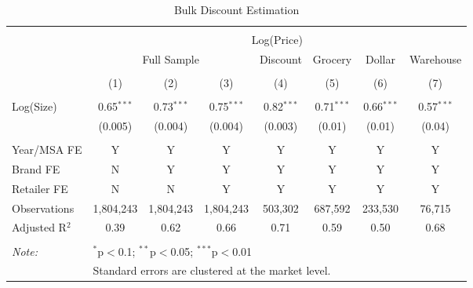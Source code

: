 
\begin{table}[!htbp] \centering 
  \caption{Bulk Discount Estimation} 
  \label{tab:bulkDiscount} 
\begin{tabular}{@{\extracolsep{5pt}}lccccccc} 
\\[-1.8ex]\hline 
\hline \\[-1.8ex] 
 & \multicolumn{7}{c}{Log(Price)} \\ 
\cline{2-8} 
 & \multicolumn{3}{c}{Full Sample} & Discount & Grocery & Dollar & Warehouse \\ 
\\[-1.8ex] & (1) & (2) & (3) & (4) & (5) & (6) & (7)\\ 
\hline \\[-1.8ex] 
 Log(Size) & 0.65$^{***}$ & 0.73$^{***}$ & 0.75$^{***}$ & 0.82$^{***}$ & 0.71$^{***}$ & 0.66$^{***}$ & 0.57$^{***}$ \\ 
  & (0.005) & (0.004) & (0.004) & (0.003) & (0.01) & (0.01) & (0.04) \\ 
 \hline \\[-1.8ex] 
Year/MSA FE & Y & Y & Y & Y & Y & Y & Y \\ 
Brand FE & N & Y & Y & Y & Y & Y & Y \\ 
Retailer FE & N & N & Y & Y & Y & Y & Y \\ 
Observations & 1,804,243 & 1,804,243 & 1,804,243 & 503,302 & 687,592 & 233,530 & 76,715 \\ 
Adjusted R$^{2}$ & 0.39 & 0.62 & 0.66 & 0.71 & 0.59 & 0.50 & 0.68 \\ 
\hline 
\hline \\[-1.8ex] 
\textit{Note:}  & \multicolumn{7}{l}{$^{*}$p$<$0.1; $^{**}$p$<$0.05; $^{***}$p$<$0.01} \\ 
 & \multicolumn{7}{l}{Standard errors are clustered at the market level.} \\ 
\end{tabular} 
\end{table} 
